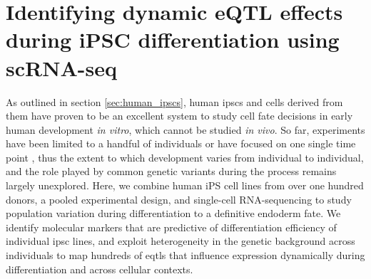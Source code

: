 
\chapter{Identifying dynamic eQTL effects during iPSC differentiation using scRNA-seq}
\label{chapter4}

As outlined in section \ref{sec:human_ipscs}, human \glspl{ipsc} and cells derived from them have proven to be an excellent system to study cell fate decisions in early human development \textit{in vitro}, which cannot be studied \textit{in vivo}.
So far, experiments have been limited to a handful of individuals \cite{} or have focused on one single time point \cite{kilpinen2017common, schwartzentruber2018molecular}, thus the extent to which development varies from individual to individual, and the role played by common genetic variants during the process remains largely unexplored.
Here, we combine human iPS cell lines from over one hundred donors, a pooled experimental design, and single-cell RNA-sequencing to study population variation during differentiation to a definitive endoderm fate. 
We identify molecular markers that are predictive of differentiation efficiency of individual \gls{ipsc} lines, and exploit heterogeneity in the genetic background across individuals to map hundreds of \glspl{eqtl} that influence expression dynamically during differentiation and across cellular contexts.\\

\newpage

